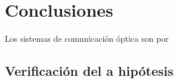 \chapter{Conclusiones}

Los sistemas de comunicación óptica son por 

\section{Verificación del a hipótesis}
